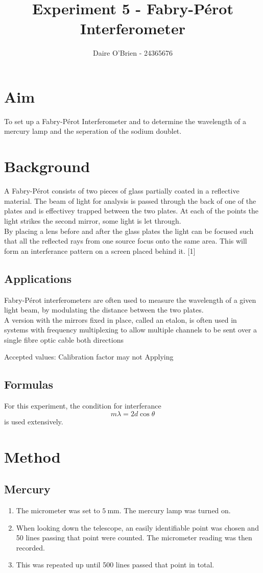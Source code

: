 \documentclass{article}
\title{Experiment 5 - Fabry-Pérot Interferometer}
\author{Daire O'Brien - 24365676}
\begin{document}
\maketitle
    \section{Aim}
        To set up a Fabry-Pérot Interferometer and to determine the wavelength of a mercury lamp and the seperation of the sodium doublet.
    \section{Background}
        A Fabry-Pérot consists of two pieces of glass partially coated in a reflective material. The beam of light for analysis is passed through the back of one of the plates and is effectivey trapped between the two plates. At each of the points the light strikes the second mirror, some light is let through. \\
        By placing a lens before and after the glass plates the light can be focused such that all the reflected rays from one source focus onto the same area. This will form an interferance pattern on a screen placed behind it. [1]
    \subsection{Applications}
        Fabry-Pérot interferometers are often used to measure the wavelength of a given light beam, by modulating the distance between the two plates. \\
        A version with the mirrors fixed in place, called an etalon, is often used in systems with frequency multiplexing to allow multiple channels to be sent over a single fibre optic cable both directions
    
        Accepted values:
        Calibration factor may not Applying
    \subsection{Formulas}
        For this experiment, the condition for interferance
            \[m \lambda = 2d \cos \theta\]
        is used extensively.
    \section{Method}
        \subsection{Mercury}
            \begin{enumerate}
                \item The micrometer was set to $\qty{5}{\mm}$. The mercury lamp was turned on.  
                \item When looking down the telescope, an easily identifiable point was chosen and 50 lines passing that point were counted. The micrometer reading was then recorded.
                \item This was repeated up until 500 lines passed that point in total. 
            \end{enumerate}
\end{document}
